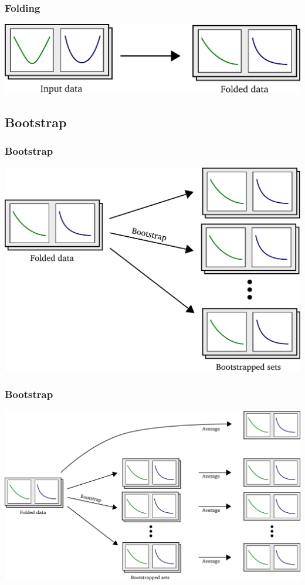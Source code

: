 \documentclass[english, fleqn]{beamer}
\begin{document}
\begin{frame}
    \frametitle{Folding}
    \begin{center}
        \includegraphics[scale=\scale]{sketches/02-folding.pdf}
    \end{center}
\end{frame}

\subsection{Bootstrap}

\begin{frame}
    \frametitle{Bootstrap}
    \begin{center}
        \includegraphics[scale=\scale]{sketches/03-bootstrap.pdf}
    \end{center}
\end{frame}

\begin{frame}
    \frametitle{Bootstrap}
    \begin{center}
        \includegraphics[scale=\scale]{sketches/04-bootstrap.pdf}
    \end{center}
\end{frame}
\end{document}
